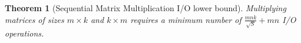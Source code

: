 \documentclass[sigplan,review,anonymous]{acmart}\settopmatter{printfolios=true,printccs=false,printacmref=false}
\newcommand\mac[1]{\textcolor{red}{[Mac: #1]}}
\newtheorem{thm}{Theorem}
\begin{document}
%
%

\begin{thm}[Sequential Matrix Multiplication I/O lower bound] 
Multiplying matrices of sizes $m \times k$ and $k \times m $ requires a minimum 
number of $\frac{mnk}{\sqrt{S}} + mn$ I/O operations.
 \label{thm:seqlowbounds}
\end{thm}
\end{document}
